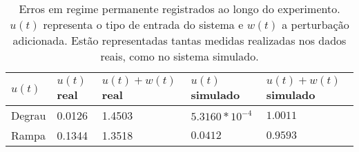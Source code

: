 


\begin{table}[h]
\centering
\caption{Erros em regime permanente registrados ao longo do experimento. $u(t)$ representa o tipo de entrada do sistema e $w(t)$ a perturbação adicionada. Estão representadas tantas medidas realizadas nos dados reais, como no sistema simulado.}
\label{tab::errors}
\begin{tabular}{@{}lllll@{}}
\toprule
$u(t)$ & $u(t)$ real & $u(t) + w(t)$ real   & $u(t)$ simulado & $u(t) + w(t)$  simulado \\ \midrule
Degrau   &   0.0126   &  1.4503  & $5.3160*10^{-4}$      &   $1.0011$   \\
Rampa    & 0.1344  & 1.3518 &      $0.0412$       &   $0.9593$\\ \bottomrule
\end{tabular}
\end{table}
